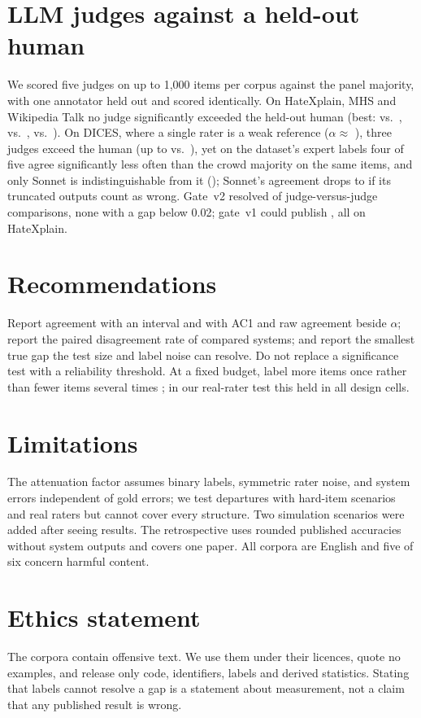 \documentclass[11pt]{article}
\begin{document}
\section{LLM judges against a held-out human}
We scored five judges on up to 1,000 items per corpus against the panel majority, with one annotator held out and scored identically. On HateXplain, MHS and Wikipedia Talk no judge significantly exceeded the held-out human (best: \jSonnetHx vs.\ \jHumanHx, \jHaikuMhs vs.\ \jHumanMhs, \jSonnetWiki vs.\ \jHumanWiki). On DICES, where a single rater is a weak reference ($\alpha\approx$ \alphaDthree), three judges exceed the human (up to \jSonnetDthree vs.\ \jHumanDthree), yet on the dataset's expert labels four of five agree significantly less often than the crowd majority on the same items, and only Sonnet is indistinguishable from it (\exMDiffSonnet [\exMLoSonnet, \exMHiSonnet]); Sonnet's agreement drops to \jSonnetDthreeInvalidWrong if its \jSonnetDthreeUnparsed truncated outputs count as wrong. Gate~v2 resolved \jPairsPass of \jPairsTotal judge-versus-judge comparisons, none with a gap below 0.02; gate~v1 could publish \jPairsVonePub, all on HateXplain.

\section{Recommendations}
Report agreement with an interval and with AC1 and raw agreement beside $\alpha$; report the paired disagreement rate of compared systems; and report the smallest true gap the test size and label noise can resolve. Do not replace a significance test with a reliability threshold. At a fixed budget, label more items once rather than fewer items several times \citep{dorner2024dont}; in our real-rater test this held in all \clFourCells design cells.

\section*{Limitations}
The attenuation factor assumes binary labels, symmetric rater noise, and system errors independent of gold errors; we test departures with hard-item scenarios and real raters but cannot cover every structure. Two simulation scenarios were added after seeing results. The retrospective uses rounded published accuracies without system outputs and covers one paper. All corpora are English and five of six concern harmful content.

\section*{Ethics statement}
The corpora contain offensive text. We use them under their licences, quote no examples, and release only code, identifiers, labels and derived statistics. Stating that labels cannot resolve a gap is a statement about measurement, not a claim that any published result is wrong.
\end{document}
